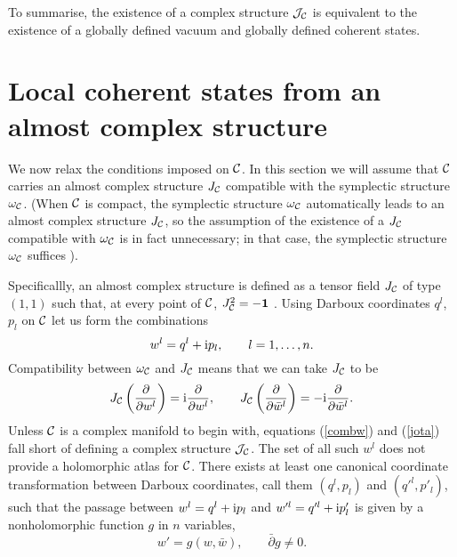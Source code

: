 \documentclass[a4paper,a4paper]{article}
\begin{document}
To summarise, the existence of a complex structure ${\cal J}_{\cal C}$ 
is equivalent to the existence of a globally defined vacuum and globally 
defined coherent states.

\section{Local coherent states from an almost complex structure}\label{loccoh}

We now relax the conditions imposed on ${\cal C}$. In this section we will assume
that ${\cal C}$ carries an almost complex structure $J_{\cal C}$ compatible with 
the symplectic structure $\omega_{\cal C}$. (When ${\cal C}$ is compact, 
the symplectic structure $\omega_{\cal C}$ automatically leads to an almost complex 
structure $J_{\cal C}$, so the assumption of the existence of a $J_{\cal C}$
compatible with $\omega_{\cal C}$ is in fact unnecessary; in that case, the 
symplectic structure $\omega_{\cal C}$ suffices \cite{MCDUFF}). 

Specificallly, an almost complex structure is defined  
as a tensor field $J_{\cal C}$ of type $(1,1)$ such that, at every point of 
${\cal C}$, $J_{\cal C}^2=-{\bf 1}$ \cite{KN}.  Using Darboux coordinates $q^l$, 
$p_l$ on ${\cal C}$ let us form the combinations
\begin{equation}
w^l=q^l + {\rm i} p_l, \qquad l=1,\ldots, n.
\label{combw}
\end{equation} 
Compatibility between $\omega_{\cal C}$ and $J_{\cal C}$ means that we can take $J_{\cal C}$ 
to be 
\begin{equation}
J_{\cal C}\left({\partial\over\partial w^l}\right)={\rm i}{\partial\over\partial w^l},
\qquad 
J_{\cal C}\left({\partial\over\partial \bar w^l}\right)=-{\rm i}{\partial\over\partial\bar w^l}.
\label{jota}
\end{equation}
Unless ${\cal C}$ is a complex  manifold to begin with, equations 
(\ref{combw}) and (\ref{jota}) fall short of defining a complex structure ${\cal J}_{\cal C}$. 
The set of all such $w^l$ does not provide a holomorphic atlas for ${\cal C}$. 
There exists at least one canonical coordinate transformation between 
Darboux coordinates, call them $(q^l, p_l)$ and $(q'^l, p'_l)$, such that 
the passage between $w^l=q^l+{\rm i}p_l$ and $w'^l=q'^l+{\rm i}p'_l$
is given by a nonholomorphic function $g$ in $n$ variables,
\begin{equation}
w'=g(w,\bar w), \qquad \bar\partial g\neq 0.
\label{nonhol}
\end{equation}
\end{document}
